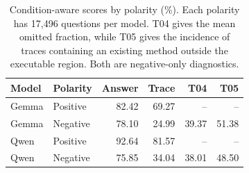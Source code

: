\begin{table}[t]
\centering
\caption{Condition-aware scores by polarity (\%). Each polarity has 17,496 questions per model. T04 gives the mean omitted fraction, while T05 gives the incidence of traces containing an existing method outside the executable region. Both are negative-only diagnostics.}
\label{tab:trace-diagnostics}
\scriptsize
\setlength{\tabcolsep}{3pt}
\begin{tabular}{llrrrr}
\toprule
Model & Polarity & Answer & Trace & T04 & T05 \\
\midrule
Gemma & Positive & 82.42 & 69.27 & -- & -- \\
Gemma & Negative & 78.10 & 24.99 & 39.37 & 51.38 \\
Qwen & Positive & 92.64 & 81.57 & -- & -- \\
Qwen & Negative & 75.85 & 34.04 & 38.01 & 48.50 \\
\bottomrule
\end{tabular}

\end{table}

